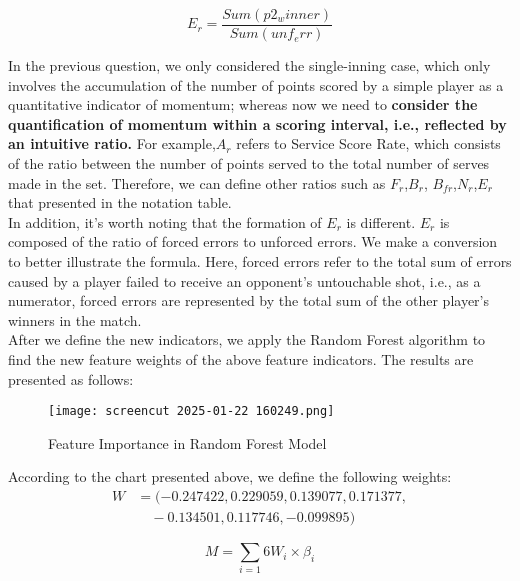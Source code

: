 \documentclass{mcmthesis}
\begin{document}
\begin{equation} \label{12}
    E_{r}=\frac{Sum(p2_winner)}{Sum(unf_err)}
\end{equation}

In the previous question, we only considered the single-inning case, which only involves the
accumulation of the number of points scored by a simple player as a quantitative indicator of
momentum; whereas now we need to {\bf consider the quantification of momentum within a
scoring interval, i.e., reflected by an intuitive ratio.} For example,$A_{r}$
refers to Service Score Rate, which consists of the ratio between the number of points served to the total number of serves
made in the set. Therefore, we can define other ratios such as $F_{r}$,$B_{r}$, $B_{fr}$,$N_{r}$,$E_{r}$
that presented in
the notation table. \\
In addition, it's worth noting that the formation of $E_{r}$ is different. $E_{r}$ is composed of the ratio
of forced errors to unforced errors. We make a conversion to better illustrate the formula. Here, forced errors refer to the total sum of errors caused by a player failed to receive an opponent's
untouchable shot, i.e., as a numerator, forced errors are represented by the total sum of the other
player's winners in the match.\\
 After we define the new indicators, we apply the Random Forest algorithm to find the new
feature weights of the above feature indicators. The results are presented as follows:


\begin{figure}[htbp]
    \centering
    \texttt{[image: screencut 2025-01-22 160249.png]}
    \caption{Feature Importance in Random Forest Model} \label{Figure 16}
\end{figure}

According to the chart presented above, we define the following weights:
\begin{equation} \label{13}
    \begin{split}
        W &= ( -0.247422, 0.229059, 0.139077, 0.171377, \\
        &\quad -0.134501, 0.117746, -0.099895 )
    \end{split}
\end{equation}
    

\begin{equation} \label{14}
    M=\sum_{i=1}{6}W_{i}\times\beta _{i}
\end{equation}
\end{document}
